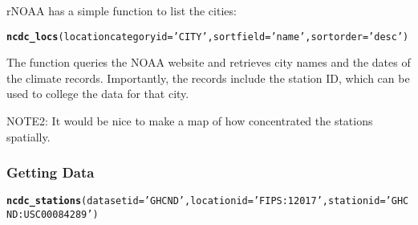 \documentclass{article}\usepackage[]{graphicx}\usepackage[]{color}
\makeatletter
\newcommand{\hlstr}[1]{\textcolor[rgb]{0.192,0.494,0.8}{#1}}%
\newcommand{\hlstd}[1]{\textcolor[rgb]{0.345,0.345,0.345}{#1}}%
\newcommand{\hlkwc}[1]{\textcolor[rgb]{0.333,0.667,0.333}{#1}}%
\newcommand{\hlkwd}[1]{\textcolor[rgb]{0.737,0.353,0.396}{\textbf{#1}}}%
\newenvironment{kframe}{%
 \def\at@end@of@kframe{}%
 \ifinner\ifhmode%
  \def\at@end@of@kframe{\end{minipage}}%
  \begin{minipage}{\columnwidth}%
 \fi\fi%
 \def\FrameCommand##1{\hskip\@totalleftmargin \hskip-\fboxsep
 \colorbox{shadecolor}{##1}\hskip-\fboxsep
     \hskip-\linewidth \hskip-\@totalleftmargin \hskip\columnwidth}%
 \MakeFramed {\advance\hsize-\width
   \@totalleftmargin\z@ \linewidth\hsize
   \@setminipage}}%
 {\par\unskip\endMakeFramed%
 \at@end@of@kframe}
\newenvironment{knitrout}{}{} %
\makeatother
\begin{document}
rNOAA has a simple function to list the cities:
\begin{knitrout}
\color{fgcolor}\begin{kframe}
\begin{alltt}
\hlkwd{ncdc_locs}\hlstd{(}\hlkwc{locationcategoryid}\hlstd{=}\hlstr{'CITY'}\hlstd{,} \hlkwc{sortfield}\hlstd{=}\hlstr{'name'}\hlstd{,} \hlkwc{sortorder}\hlstd{=}\hlstr{'desc'}\hlstd{)}
\end{alltt}


{\ttfamily\noindent\bfseries{}}\end{kframe}
\end{knitrout}

The function queries the NOAA website and retrieves city names and the dates of the climate records. Importantly, the records include the station ID, which can be used to college the data for that city. 


NOTE2: It would be nice to make a map of how concentrated the stations spatially. 

\subsubsection{Getting Data}

\begin{knitrout}
\color{fgcolor}\begin{kframe}
\begin{alltt}
\hlkwd{ncdc_stations}\hlstd{(}\hlkwc{datasetid}\hlstd{=}\hlstr{'GHCND'}\hlstd{,} \hlkwc{locationid}\hlstd{=}\hlstr{'FIPS:12017'}\hlstd{,} \hlkwc{stationid}\hlstd{=}\hlstr{'GHCND:USC00084289'}\hlstd{)}
\end{alltt}


{\ttfamily\noindent\bfseries{}}\end{kframe}
\end{knitrout}
\end{document}

